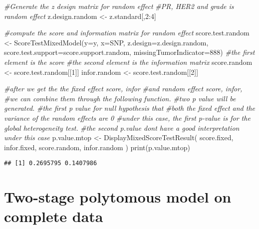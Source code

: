 \documentclass[11pt,]{article}
\newenvironment{Shaded}{\begin{snugshade}}{\end{snugshade}}
\newcommand{\AttributeTok}[1]{\textcolor[rgb]{0.77,0.63,0.00}{#1}}
\newcommand{\CommentTok}[1]{\textcolor[rgb]{0.56,0.35,0.01}{\textit{#1}}}
\newcommand{\DecValTok}[1]{\textcolor[rgb]{0.00,0.00,0.81}{#1}}
\newcommand{\FunctionTok}[1]{\textcolor[rgb]{0.00,0.00,0.00}{#1}}
\newcommand{\NormalTok}[1]{#1}
\newcommand{\OtherTok}[1]{\textcolor[rgb]{0.56,0.35,0.01}{#1}}
\newcommand{\SpecialCharTok}[1]{\textcolor[rgb]{0.00,0.00,0.00}{#1}}
\begin{document}
\begin{Shaded}
\begin{Highlighting}[]
\CommentTok{\#Generate the z design matrix for random effect}
\CommentTok{\#PR, HER2 and grade is random effect}
\NormalTok{z.design.random }\OtherTok{\textless{}{-}}\NormalTok{ z.standard[,}\DecValTok{2}\SpecialCharTok{:}\DecValTok{4}\NormalTok{]}

\CommentTok{\#compute the score and information matrix for random effect}
\NormalTok{score.test.random }\OtherTok{\textless{}{-}} \FunctionTok{ScoreTestMixedModel}\NormalTok{(}\AttributeTok{y=}\NormalTok{y,}
                                         \AttributeTok{x=}\NormalTok{SNP,}
                                         \AttributeTok{z.design=}\NormalTok{z.design.random,}
                                         \AttributeTok{score.test.support=}\NormalTok{score.support.random,}
                                         \AttributeTok{missingTumorIndicator=}\DecValTok{888}\NormalTok{)}
\CommentTok{\#the first element is the score}
\CommentTok{\#the second element is the information matrix}
\NormalTok{score.random }\OtherTok{\textless{}{-}}\NormalTok{ score.test.random[[}\DecValTok{1}\NormalTok{]]}
\NormalTok{infor.random }\OtherTok{\textless{}{-}}\NormalTok{ score.test.random[[}\DecValTok{2}\NormalTok{]]}

\CommentTok{\#after we get the the fixed effect score, infor }
\CommentTok{\#and random effect score, infor, }
\CommentTok{\#we can combine them through the following function. }
\CommentTok{\#two p value will be generated.}
\CommentTok{\#the first p value for null hypothesis that}
\CommentTok{\#both the fixed effect and the variance of the random effects are 0}
\CommentTok{\#under this case, the first p{-}value is for the global heterogeneity test.}
\CommentTok{\#the second p.value don\textquotesingle{}t have a good interpretation under this case}
\NormalTok{p.value.mtop }\OtherTok{\textless{}{-}} \FunctionTok{DisplayMixedScoreTestResult}\NormalTok{(}
\NormalTok{  score.fixed,}
\NormalTok{  infor.fixed,}
\NormalTok{  score.random,}
\NormalTok{  infor.random}
\NormalTok{)  }
\FunctionTok{print}\NormalTok{(p.value.mtop)}
\end{Highlighting}
\end{Shaded}

\begin{verbatim}
## [1] 0.2695795 0.1407986
\end{verbatim}

\hypertarget{two-stage-polytomous-model-on-complete-data}{%
\section{Two-stage polytomous model on complete
data}\label{two-stage-polytomous-model-on-complete-data}}
\end{document}
